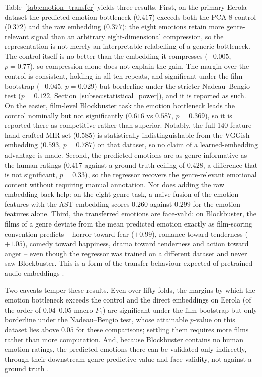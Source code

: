 Table~\ref{tab:emotion_transfer} yields three results. First, on the primary Eerola dataset
the predicted-emotion bottleneck ($0.417$) exceeds both the PCA-8 control ($0.372$) and the
raw embedding ($0.377$): the eight emotions retain more genre-relevant signal than an
arbitrary eight-dimensional compression, so the representation is not merely an interpretable
relabelling of a generic bottleneck. The control itself is no better than the embedding it
compresses ($-0.005$, $p=0.77$), so compression alone does not explain the gain. The margin
over the control is consistent, holding in all ten repeats, and significant under the film
bootstrap ($+0.045$, $p=0.029$) but borderline under the stricter Nadeau--Bengio test
($p=0.122$, Section~\ref{subsec:statistical_power}), and it is reported as such. On the easier,
film-level Blockbuster task the emotion bottleneck leads the control nominally but not
significantly ($0.616$ vs $0.587$, $p=0.369$), so it is reported there as competitive
rather than superior. Notably, the full 140-feature hand-crafted MIR set ($0.585$) is
statistically indistinguishable from the VGGish embedding ($0.593$, $p=0.787$) on that
dataset, so no claim of a learned-embedding advantage is made. Second, the predicted emotions are as genre-informative as the human
ratings ($0.417$ against a ground-truth ceiling of $0.428$, a difference that is not
significant, $p=0.33$), so the regressor recovers the genre-relevant emotional content
without requiring manual annotation. Nor does adding the raw embedding back help: on the
eight-genre task, a naive fusion of the emotion features with the AST embedding scores
$0.260$ against $0.299$ for the emotion features alone. Third,
the transferred emotions are face-valid: on Blockbuster, the films of a genre deviate from
the mean predicted emotion exactly as film-scoring convention predicts -- horror toward fear
($+0.99$), romance toward tenderness ($+1.05$), comedy toward happiness, drama toward
tenderness and action toward anger -- even though the regressor was trained on a different
dataset and never saw Blockbuster. This is a form of the transfer behaviour expected of
pretrained audio embeddings \citep{choi2017transfer}.

Two caveats temper these results. Even over fifty folds, the margins by which the emotion
bottleneck exceeds the control and the direct embeddings on Eerola (of the order of
$0.04$--$0.05$ macro-$F_1$) are significant under the film bootstrap but only borderline
under the Nadeau--Bengio test, whose attainable $p$-value on this dataset lies above $0.05$
for these comparisons; settling them requires more films rather than more computation. And, because Blockbuster contains no human
emotion ratings, the predicted emotions there can be validated only indirectly, through their
downstream genre-predictive value and face validity, not against a ground truth
\citep{ma2021computational,eerola2011comparison}.
